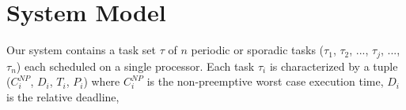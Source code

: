 \section{System Model}\label{sec:system_model}

Our system contains a task set \begin{math}\tau\end{math} of $n$ periodic or sporadic tasks (\begin{math}\tau_{1}\end{math}, \begin{math}\tau_{2}\end{math}, ..., \begin{math}\tau_{j}\end{math}, ..., \begin{math}\tau_{n}\end{math}) each scheduled on a single processor.  Each task \begin{math}\tau_{i}\end{math} is characterized by a tuple (\begin{math}C_{i}^{NP}\end{math}, \begin{math}D_{i}\end{math}, \begin{math}T_{i}\end{math}, \begin{math}P_{i}\end{math}) where
\begin{math}C_{i}^{NP}\end{math} is the non-preemptive worst case execution time, \begin{math}D_{i}\end{math} is the relative deadline, %
